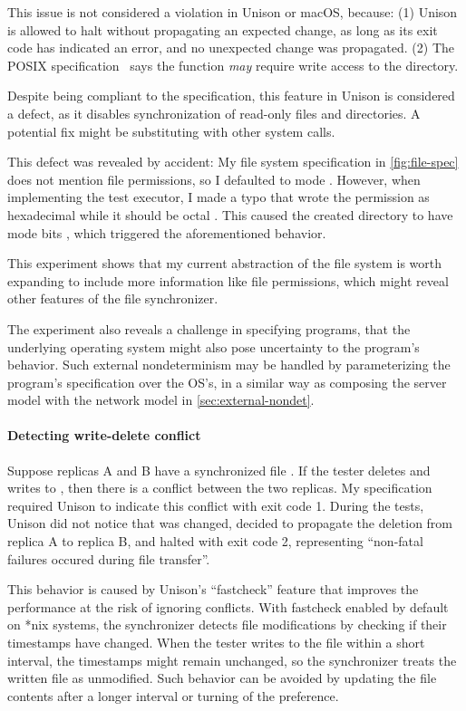 This issue is not considered a violation in Unison or macOS, because: (1) Unison
is allowed to halt without propagating an expected change, as long as its exit
code has indicated an error, and no unexpected change was propagated.  (2) The
POSIX specification~\cite{posix} says the  function {\it may}
require write access to the directory.

Despite being compliant to the specification, this feature in Unison is
considered a defect, as it disables synchronization of read-only files and
directories.  A potential fix might be substituting  with other
system calls.

This defect was revealed by accident: My file system specification in
\autoref{fig:file-spec} does not mention file permissions, so I defaulted to
mode .  However, when implementing the test executor, I made a typo
that wrote the permission as hexadecimal  while it should be octal
.  This caused the created directory to have mode bits ,
which triggered the aforementioned behavior.

This experiment shows that my current abstraction of the file system is worth
expanding to include more information like file permissions, which might reveal
other features of the file synchronizer.

The experiment also reveals a challenge in specifying programs, that the
underlying operating system might also pose uncertainty to the program's
behavior.  Such external nondeterminism may be handled by parameterizing the
program's specification over the OS's, in a similar way as composing the server
model with the network model in \autoref{sec:external-nondet}.

\paragraph{Detecting write-delete conflict}
Suppose replicas \ilj A and \ilj B have a synchronized file .  If
the tester deletes  and writes to , then there is
a conflict between the two replicas.  My specification required Unison to
indicate this conflict with exit code 1.  During the tests, Unison did not
notice that  was changed, decided to propagate the deletion from
replica \ilj A to replica \ilj B, and halted with exit code 2, representing
``non-fatal failures occured during file transfer''.

This behavior is caused by Unison's ``fastcheck'' feature that improves the
performance at the risk of ignoring conflicts.  With fastcheck enabled by
default on *nix systems, the synchronizer detects file modifications by checking
if their timestamps have changed.  When the tester writes to the file within a
short interval, the timestamps might remain unchanged, so the synchronizer
treats the written file as unmodified.  Such behavior can be avoided by updating
the file contents after a longer interval or turning of the preference.

